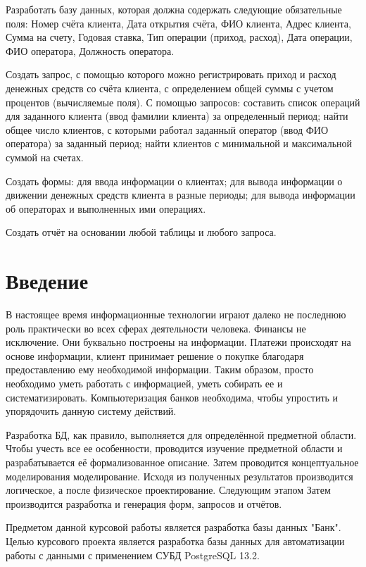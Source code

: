 \documentclass[14pt]{extarticle}
\begin{document}
    Разработать базу данных, которая должна содержать следующие обязательные поля: Номер счёта клиента, Дата открытия счёта, ФИО клиента, Адрес клиента, Сумма на счету, Годовая ставка, Тип операции (приход, расход), Дата операции, ФИО оператора, Должность оператора.

    Создать запрос, с помощью которого можно регистрировать приход и расход денежных средств со счёта клиента, с определением общей суммы с учетом процентов (вычисляемые поля). С помощью запросов: составить список операций для заданного клиента (ввод фамилии клиента) за определенный период; найти общее число клиентов, с которыми работал заданный оператор (ввод ФИО оператора) за заданный период; найти клиентов с минимальной и максимальной суммой на счетах.

    Создать формы: для ввода информации о клиентах; для вывода информации о движении денежных средств клиента в разные периоды; для вывода информации об операторах и выполненных ими операциях.

    Создать отчёт на основании любой таблицы и любого запроса.

    \newpage

    \section*{Введение}

    В настоящее время информационные технологии играют далеко не последнюю роль практически во всех сферах деятельности человека. Финансы не исключение. Они буквально построены на информации. Платежи происходят на основе информации, клиент принимает решение о покупке благодаря предоставлению ему необходимой информации. Таким образом, просто необходимо уметь работать с информацией, уметь собирать ее и систематизировать. Компьютеризация банков необходима, чтобы упростить и упорядочить данную систему действий.

    Разработка БД, как правило, выполняется для определённой предметной области. Чтобы учесть все ее особенности, проводится изучение предметной области и разрабатывается её формализованное описание. Затем проводится концептуальное моделирования моделирование. Исходя из полученных результатов производится логическое, а после физическое проектирование.
    Следующим этапом Затем производится разработка и генерация форм, запросов и отчётов.

    Предметом данной курсовой работы является разработка базы данных "Банк". Целью курсового проекта является разработка базы данных для автоматизации работы с данными с применением СУБД PostgreSQL 13.2.
\end{document}
